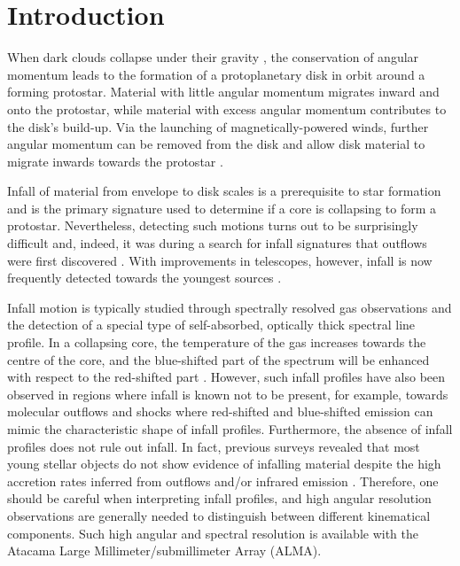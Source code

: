 \documentclass{aa}
\begin{document}
\section{Introduction}
\label{sec:intro}
%
When dark clouds collapse under their gravity \citep{Shu:1987fk}, the conservation of angular momentum  leads to the formation of a protoplanetary disk in orbit around a forming protostar. Material with little angular momentum migrates inward and onto the protostar, while material with excess angular momentum contributes to the disk's build-up. Via the launching of magnetically-powered winds, further angular momentum can be removed from the disk  \citep{Blandford:1982fj,Pudritz:1983fv,Shu:1994kx} and allow disk material to migrate inwards towards the protostar \citep{Gravity-Collaboration:2020tu}.

Infall of material from envelope to disk scales is a prerequisite to star formation and is the primary signature used to determine if a core is collapsing to form a protostar. Nevertheless, detecting such motions turns out to be surprisingly difficult and, indeed, it was during a search for infall signatures that outflows were first discovered \citep{Snell:1979fk,Snell:1980lr}. With improvements in telescopes, however, infall is now frequently detected towards the youngest sources \citep[e.g.][]{Kristensen:2012kx}. 

Infall motion is typically studied through spectrally resolved gas observations and the detection of a special type of self-absorbed, optically thick spectral line profile. In a collapsing core, the temperature of the gas increases towards the centre of the core, and the blue-shifted part of the spectrum will be enhanced with respect to the red-shifted part \citep{Leung:1977gs}. 
However, such infall profiles have also been observed in regions where infall is known not to be present, for example, towards molecular outflows and shocks \citep{Bjerkeli:2012fk,Bjerkeli:2011qy} where red-shifted and blue-shifted emission can mimic the characteristic shape of infall profiles. Furthermore, the absence of infall profiles does not rule out infall. In fact, previous surveys revealed that most young stellar objects do not show evidence of infalling material despite the high accretion rates inferred from outflows and/or infrared emission \citep[e.g.][]{Carney:2016kf, Heiderman:2015fm}. Therefore, one should be careful when interpreting infall profiles, and high angular resolution observations are generally needed to distinguish between different kinematical components. Such high angular and spectral resolution is available with the Atacama Large Millimeter/submillimeter Array (ALMA). 
\end{document}
